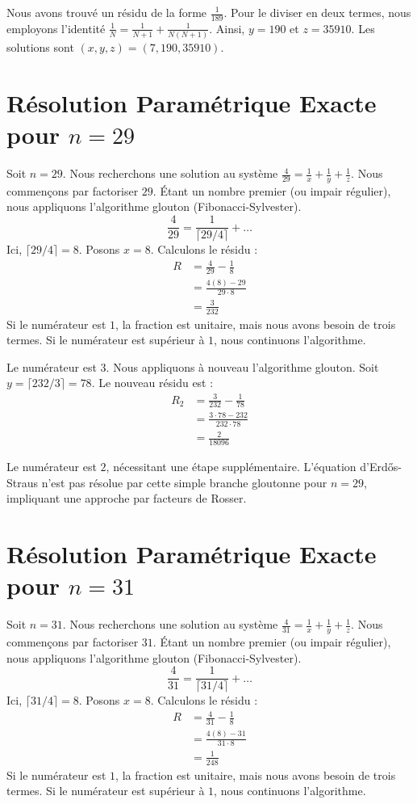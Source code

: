 \documentclass[11pt,a4paper]{article}
\begin{document}
Nous avons trouvé un résidu de la forme $\frac{1}{189}$. Pour le diviser en deux termes, nous employons l'identité $\frac{1}{N} = \frac{1}{N+1} + \frac{1}{N(N+1)}$.
Ainsi, $y = 190$ et $z = 35910$.
Les solutions sont $(x, y, z) = (7, 190, 35910)$.

\section{Résolution Paramétrique Exacte pour $n = 29$}
Soit $n = 29$. Nous recherchons une solution au système $\frac{4}{29} = \frac{1}{x} + \frac{1}{y} + \frac{1}{z}$.
Nous commençons par factoriser $29$. Étant un nombre premier (ou impair régulier), nous appliquons l'algorithme glouton (Fibonacci-Sylvester).
\begin{equation}
\frac{4}{29} = \frac{1}{\lceil 29/4 \rceil} + \ldots
\end{equation}
Ici, $\lceil 29/4 \rceil = 8$. Posons $x = 8$.
Calculons le résidu :
\begin{align*}
R &= \frac{4}{29} - \frac{1}{8} \\
&= \frac{4(8) - 29}{29 \cdot 8} \\
&= \frac{3}{232}
\end{align*}
Si le numérateur est $1$, la fraction est unitaire, mais nous avons besoin de trois termes. Si le numérateur est supérieur à $1$, nous continuons l'algorithme.

Le numérateur est $3$. Nous appliquons à nouveau l'algorithme glouton.
Soit $y = \lceil 232/3 \rceil = 78$.
Le nouveau résidu est :
\begin{align*}
R_2 &= \frac{3}{232} - \frac{1}{78} \\
&= \frac{3 \cdot 78 - 232}{232 \cdot 78} \\
&= \frac{2}{18096}
\end{align*}

Le numérateur est $2$, nécessitant une étape supplémentaire. L'équation d'Erd\H{o}s-Straus n'est pas résolue par cette simple branche gloutonne pour $n=29$, impliquant une approche par facteurs de Rosser.

\section{Résolution Paramétrique Exacte pour $n = 31$}
Soit $n = 31$. Nous recherchons une solution au système $\frac{4}{31} = \frac{1}{x} + \frac{1}{y} + \frac{1}{z}$.
Nous commençons par factoriser $31$. Étant un nombre premier (ou impair régulier), nous appliquons l'algorithme glouton (Fibonacci-Sylvester).
\begin{equation}
\frac{4}{31} = \frac{1}{\lceil 31/4 \rceil} + \ldots
\end{equation}
Ici, $\lceil 31/4 \rceil = 8$. Posons $x = 8$.
Calculons le résidu :
\begin{align*}
R &= \frac{4}{31} - \frac{1}{8} \\
&= \frac{4(8) - 31}{31 \cdot 8} \\
&= \frac{1}{248}
\end{align*}
Si le numérateur est $1$, la fraction est unitaire, mais nous avons besoin de trois termes. Si le numérateur est supérieur à $1$, nous continuons l'algorithme.
\end{document}
